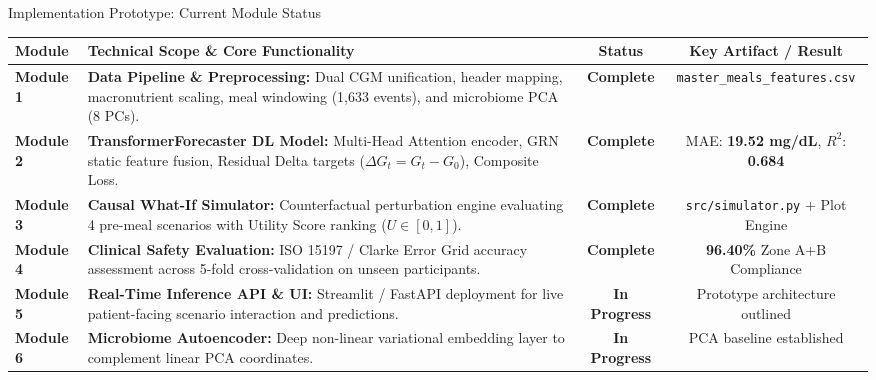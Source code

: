 \documentclass[10pt,aspectratio=169]{beamer}
\begin{document}
\begin{frame}{Implementation Prototype: Current Module Status}
    \justifying
    \small
    \renewcommand{\arraystretch}{1.3}
    \begin{table}
    \centering
    \begin{tabularx}{\textwidth}{l X c c}
        \toprule
        \rowcolor{RedHeader} \color{white}\textbf{Module} & \color{white}\textbf{Technical Scope \& Core Functionality} & \color{white}\textbf{Status} & \color{white}\textbf{Key Artifact / Result} \\
        \midrule
        \textbf{Module 1} & \textbf{Data Pipeline \& Preprocessing:} Dual CGM unification, header mapping, macronutrient scaling, meal windowing (1,633 events), and microbiome PCA (8 PCs). & \textcolor{GreenAccent}{\textbf{Complete}} & \texttt{master\_meals\_features.csv} \\
        \rowcolor{RedLight}
        \textbf{Module 2} & \textbf{TransformerForecaster DL Model:} Multi-Head Attention encoder, GRN static feature fusion, Residual Delta targets ($\Delta G_t = G_t - G_0$), Composite Loss. & \textcolor{GreenAccent}{\textbf{Complete}} & MAE: \textbf{19.52 mg/dL}, $R^2$: \textbf{0.684} \\
        \textbf{Module 3} & \textbf{Causal What-If Simulator:} Counterfactual perturbation engine evaluating 4 pre-meal scenarios with Utility Score ranking ($U \in [0,1]$). & \textcolor{GreenAccent}{\textbf{Complete}} & \texttt{src/simulator.py} + Plot Engine \\
        \rowcolor{RedLight}
        \textbf{Module 4} & \textbf{Clinical Safety Evaluation:} ISO 15197 / Clarke Error Grid accuracy assessment across 5-fold cross-validation on unseen participants. & \textcolor{GreenAccent}{\textbf{Complete}} & \textbf{96.40\%} Zone A+B Compliance \\
        \textbf{Module 5} & \textbf{Real-Time Inference API \& UI:} Streamlit / FastAPI deployment for live patient-facing scenario interaction and predictions. & \textcolor{orange!90!black}{\textbf{In Progress}} & Prototype architecture outlined \\
        \rowcolor{RedLight}
        \textbf{Module 6} & \textbf{Microbiome Autoencoder:} Deep non-linear variational embedding layer to complement linear PCA coordinates. & \textcolor{orange!90!black}{\textbf{In Progress}} & PCA baseline established \\
        \bottomrule
    \end{tabularx}
    \end{table}
\end{frame}
\end{document}

